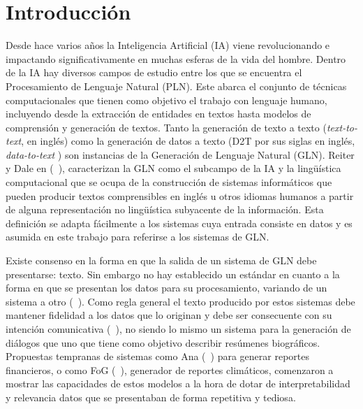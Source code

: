 \chapter*{Introducción}\label{chapter:introduction}

    Desde hace varios años la Inteligencia Artificial (IA) viene revolucionando e \\impactando significativamente en muchas esferas de la 
vida del hombre. Dentro de la IA hay diversos campos de estudio entre los que se encuentra el Procesamiento de Lenguaje Natural (PLN). Este abarca el conjunto de 
t\'ecnicas computacionales que tienen como objetivo el trabajo con lenguaje humano, incluyendo desde la extracci\'on de entidades en textos hasta modelos 
de comprensi\'on y generación de textos. Tanto la generación de texto a texto (\emph{text-to-text}, en inglés) como la generación de 
datos a texto (D2T por sus siglas en inglés, \emph{data-to-text} ) son instancias de la Generación de Lenguaje Natural (GLN). Reiter y Dale en (~\cite{Reiter1997BuildingAN}), 
caracterizan la GLN como el subcampo de la IA y la lingüística computacional que se ocupa de la construcción de sistemas informáticos que pueden 
producir textos comprensibles en inglés u otros idiomas humanos a partir de alguna representación no lingüística subyacente de la información. 
Esta definición se adapta fácilmente a los sistemas cuya entrada consiste en datos y es asumida en este trabajo para referirse a los sistemas de GLN. 
    
    Existe consenso en la forma en que la salida de un sistema de GLN debe presentarse: texto. Sin embargo no hay establecido un est\'andar en cuanto a la forma en 
que se presentan los datos para su procesamiento, variando de un sistema a otro (~\cite{reiter_dale_2000,Gatt2018SurveyOT}). Como regla general el texto producido por estos sistemas 
debe mantener fidelidad a los datos que lo originan y debe ser consecuente con su intención comunicativa (~\cite{reiter_dale_2000}), no siendo lo mismo un 
sistema para la generación de diálogos que uno que tiene como objetivo describir resúmenes biográficos. Propuestas tempranas de sistemas como Ana (~\cite{kukich1983design}) para 
generar reportes financieros, o como FoG (~\cite{goldberg1994using}), generador de reportes climáticos, comenzaron a mostrar las capacidades de estos 
modelos a la hora de dotar de interpretabilidad y relevancia datos que se presentaban de forma repetitiva y tediosa.
  
